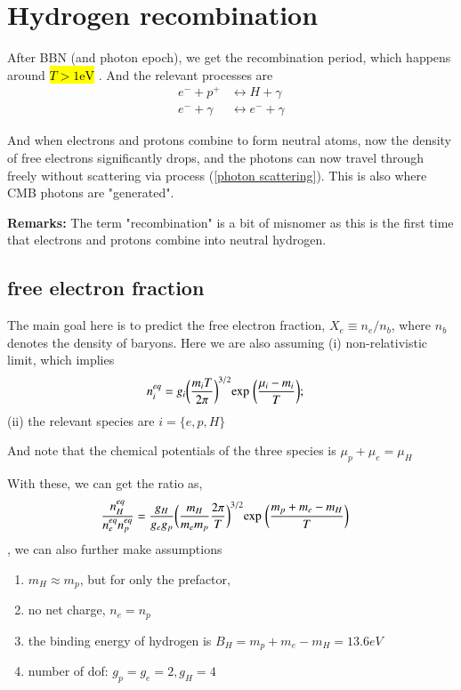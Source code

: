 \documentclass[a4paper, 12pt]{article}
\begin{document}
{{\section{Hydrogen recombination}%
  \label{sub:Hydrogen recombination}

After BBN (and photon epoch), we get the recombination period, which
happens around  \hl{$ T > 1 \mathrm{eV}$ }. And the relevant processes
are 
\begin{align}
  \label{hyrogen recombination processes}
  e^- + p^+ &\leftrightarrow H + \gamma \\ 
  \label{photon scattering}
  e^- + \gamma &\leftrightarrow e^- + \gamma 
\end{align}
  
And when electrons and protons combine to form neutral atoms, now the density
of free electrons significantly drops, and the photons can now travel
through freely without scattering via process (\ref{photon scattering}).
This is also where CMB photons are "generated". 

\textbf{Remarks: } The term "recombination" is a bit of misnomer as this is
the first time that electrons and protons combine into neutral hydrogen.

\subsection{free electron fraction}%
  \label{sub:free electron fraction}
  The main  goal here is to predict the free electron fraction, \( X_e
  \equiv n_e / n_b \), where \( n_b \) denotes the density of baryons.
  Here we are also assuming (i) non-relativistic limit, which implies 
  \begin{align}
    \label{equilibrium abundancces of species in hydrogen
    recombination}
    n_{i}^{eq} &= g_i \bigg(\frac{m_i T}{2 \pi} \bigg)^{3/2} \mathrm{exp}
    \hspace{0.1cm} \bigg( \frac{\mu_i - m_i}{T} \bigg); 
  \end{align}
(ii) the relevant species are \( i = \{ e, p, H \} \)

  And note that the chemical potentials of the three species is \( \mu_p +
  \mu_e = \mu_H \)

With these, we can get the ratio as, 
\begin{align}
  \label{ratio hydrogen over electrons and protons}
  \frac{n_{H}^{eq}}{n_{e}^{eq} n_{p}^{eq}} &= \frac{g_H}{g_e g_p} \bigg(
  \frac{m_H}{m_e m_p} \frac{2\pi}{T} \bigg)^{3/2} \mathrm{exp}
  \hspace{0.1cm} \bigg( \frac{m_p + m_e - m_H}{T} \bigg) 
\end{align}, we can also further make assumptions 
\begin{enumerate}
  \item[\circ] \( m_H \approx m_p \), but for only the prefactor, 
  \item[\circ]  no net charge, \( n_e = n_p \)
  \item[\circ] the binding energy of hydrogen is \( B_H = m_p + m_e - m_H
  = 13.6 eV\)
  \item[\circ] number of dof: \( g_p = g_e = 2, g_H = 4 \)
\end{enumerate}

}}
\end{document}
